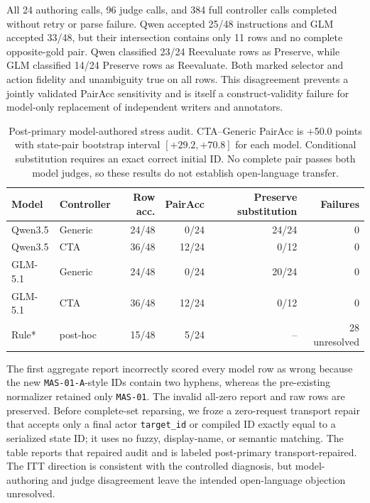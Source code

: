 \documentclass[10pt]{article}
\begin{document}
All 24 authoring calls, 96 judge calls, and 384 full controller calls completed without retry or
parse failure. Qwen accepted 25/48 instructions and GLM accepted 33/48, but their intersection
contains only 11 rows and no complete opposite-gold pair. Qwen classified 23/24 Reevaluate rows as
Preserve, while GLM classified 14/24 Preserve rows as Reevaluate. Both marked selector and action
fidelity and unambiguity true on all rows. This disagreement prevents a jointly validated PairAcc
sensitivity and is itself a construct-validity failure for model-only replacement of independent
writers and annotators.

\begin{table}[H]
\centering
\small
\begin{tabular}{llrrrr}
\toprule
Model & Controller & Row acc. & PairAcc & Preserve substitution & Failures \\
\midrule
Qwen3.5 & Generic & 24/48 & 0/24 & 24/24 & 0 \\
Qwen3.5 & CTA & 36/48 & 12/24 & 0/12 & 0 \\
GLM-5.1 & Generic & 24/48 & 0/24 & 20/24 & 0 \\
GLM-5.1 & CTA & 36/48 & 12/24 & 0/12 & 0 \\
Rule* & post-hoc & 15/48 & 5/24 & -- & 28 unresolved \\
\bottomrule
\end{tabular}
\caption{Post-primary model-authored stress audit. CTA--Generic PairAcc is +50.0 points with
state-pair bootstrap interval $[+29.2,+70.8]$ for each model. Conditional substitution requires
an exact correct initial ID. No complete pair passes both model judges, so these results do not
establish open-language transfer.}
\end{table}

The first aggregate report incorrectly scored every model row as wrong because the new
\texttt{MAS-01-A}-style IDs contain two hyphens, whereas the pre-existing normalizer retained only
\texttt{MAS-01}. The invalid all-zero report and raw rows are preserved. Before complete-set
reparsing, we froze a zero-request transport repair that accepts only a final actor
\texttt{target\_id} or compiled ID exactly equal to a serialized state ID; it uses no fuzzy,
display-name, or semantic matching. The table reports that repaired audit and is labeled
post-primary transport-repaired. The ITT direction is consistent with the controlled diagnosis,
but model-authoring and judge disagreement leave the intended open-language objection unresolved.
\end{document}
